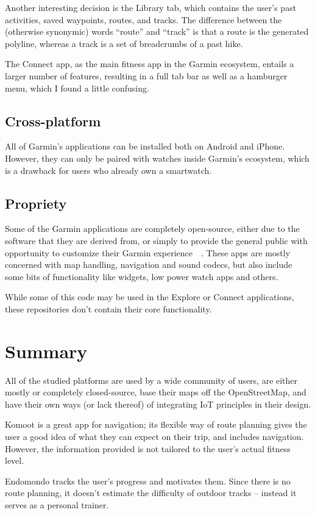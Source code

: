 Another interesting decision is the Library tab, which contains the user's past activities, saved waypoints, routes, and tracks.
The difference between the (otherwise synonymic) words ``route'' and ``track'' is that a route is the generated polyline, whereas a track is a set of breadcrumbs of a past hike.

The Connect app, as the main fitness app in the Garmin ecosystem, entails a larger number of features, resulting in a full tab bar as well as a hamburger menu, which I found a little confusing.

\subsection*{Cross-platform}
All of Garmin's applications can be installed both on Android and iPhone.
However, they can only be paired with watches inside Garmin's ecosystem, which is a drawback for users who already own a smartwatch.
\subsection*{Propriety}
Some of the Garmin applications are completely open-source, either due to the software that they are derived from, or simply to provide the general public with opportunity to customize their Garmin experience~\cite{garmin-open-source}~\cite{garmin-connect-github-repos}.
These apps are mostly concerned with map handling, navigation and sound codecs, but also include some bits of functionality like widgets, low power watch apps and others.

While some of this code may be used in the Explore or Connect applications, these repositories don't contain their core functionality.

\section{Summary}
All of the studied platforms are used by a wide community of users, are either mostly or completely closed-source, base their maps off the OpenStreetMap, and have their own ways (or lack thereof) of integrating IoT principles in their design.

Komoot is a great app for navigation; its flexible way of route planning gives the user a good idea of what they can expect on their trip,
and includes navigation.
However, the information provided is not tailored to the user's actual fitness level.

Endomondo tracks the user's progress and motivates them.
Since there is no route planning, it doesn't estimate the difficulty of outdoor tracks -- instead it serves as a personal trainer.

